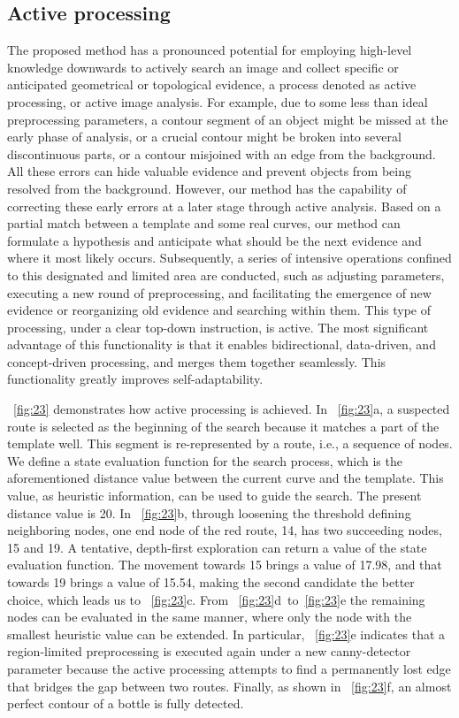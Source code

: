 \documentclass[journal]{IEEEtran}
\begin{document}
\subsection{Active processing}

The proposed method has a pronounced potential for employing high-level knowledge downwards to actively search an image and collect specific or anticipated geometrical or topological evidence, 
a process denoted as active processing, or active image analysis. 
For example, due to some less than ideal preprocessing parameters, 
a contour segment of an object might be missed at the early phase of analysis, 
or a crucial contour might be broken into several discontinuous parts, 
or a contour misjoined with an edge from the background. 
All these errors can hide valuable evidence and prevent objects from being resolved from the background. 
However, our method has the capability of correcting these early errors at a later stage through active analysis. 
Based on a partial match between a template and some real curves, 
our method can formulate a hypothesis and anticipate what should be the next evidence and where it most likely occurs. 
Subsequently, a series of intensive operations confined to this designated and limited area are conducted, 
such as adjusting parameters, executing a new round of preprocessing, 
and facilitating the emergence of new evidence or reorganizing old evidence and searching within them. 
This type of processing, under a clear top-down instruction, is active. 
The most significant advantage of this functionality is that it enables bidirectional, data-driven, 
and concept-driven processing, and merges them together seamlessly. 
This functionality greatly improves self-adaptability.

\figurename~\ref{fig:23} demonstrates how active processing is achieved. 
In \figurename~\ref{fig:23}a, a suspected route is selected as the beginning of the search because it matches a part of the template well. 
This segment is re-represented by a route, i.e., a sequence of nodes. 
We define a state evaluation function for the search process, 
which is the aforementioned distance value between the current curve and the template. 
This value, as heuristic information, can be used to guide the search. 
The present distance value is 20. 
In \figurename~\ref{fig:23}b, through loosening the threshold defining neighboring nodes, 
one end node of the red route, 14, has two succeeding nodes, 15 and 19. 
A tentative, depth-first exploration can return a value of the state evaluation function. 
The movement towards 15 brings a value of 17.98, and that towards 19 brings a value of 15.54, 
making the second candidate the better choice, which leads us to \figurename~\ref{fig:23}c. 
From \figurename~\ref{fig:23}d~to~\ref{fig:23}e the remaining nodes can be evaluated in the same manner, 
where only the node with the smallest heuristic value can be extended. 
In particular, \figurename~\ref{fig:23}e indicates that a region-limited preprocessing is executed again under a new canny-detector parameter because the active processing attempts to find a permanently lost edge that bridges the gap between two routes. 
Finally, as shown in \figurename~\ref{fig:23}f, an almost perfect contour of a bottle is fully detected.
\end{document}
